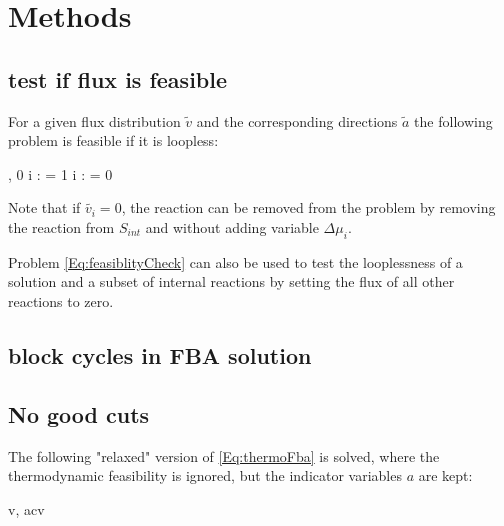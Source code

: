 \section{Methods}


\subsection{test if flux is feasible}
For a given flux distribution $\widetilde{v}$ and the corresponding directions $\widetilde{a}$ the following problem is feasible if it is loopless:
\begin{maxi!}
    {\scriptstyle \Delta \mu, \mu}{0}{\label{Eq:feasiblityCheck}}{} 
     {\forall i \in {}:  = 1}    
     {\forall i \in {}:  = 0}        
\end{maxi!} 
Note that if $\widetilde{v_i} = 0$, the reaction can be removed from the problem by removing the reaction from $S_{int}$ and without adding variable $\Delta \mu_i$. 

Problem \cref{Eq:feasiblityCheck} can also be used to test the looplessness of a solution and a subset of internal reactions by setting the flux of all other reactions to zero.

\subsection{block cycles in FBA solution}

\subsection{No good cuts}
The following "relaxed" version of \cref{Eq:thermoFba} is solved, where the thermodynamic feasibility is ignored, but the indicator variables $a$ are kept:
\begin{maxi!}
    {\scriptstyle v, a}{c\tran v}{\label{Eq:noGoodCut}}{} 
          
\end{maxi!}

